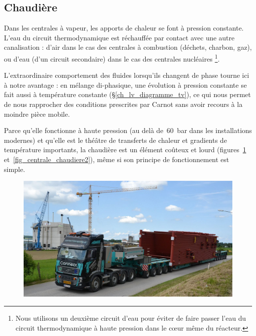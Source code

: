 	\subsection{Chaudière}
	\label{ch_chaudière}

		Dans les centrales à vapeur, les apports de chaleur se font à pression constante. L’eau du circuit thermodynamique est réchauffée par contact avec une autre canalisation : d’air dans le cas des centrales à combustion (déchets, charbon, gaz), ou d’eau (d’un circuit secondaire) dans le cas des centrales nucléaires%
		\footnote{Nous utilisons un deuxième circuit d’eau pour éviter de faire passer l’eau du circuit thermodynamique à haute pression dans le cœur même du réacteur.}\nolinebreak.

		L’extraordinaire comportement des fluides lorsqu’ils changent de phase tourne ici à notre avantage : en mélange di-phasique, une évolution à pression constante se fait aussi à température constante (\S\ref{ch_lv_diagramme_tv}),	ce qui nous permet de nous rapprocher des conditions prescrites par Carnot sans avoir recours à la moindre pièce mobile.
		
		Parce qu’elle fonctionne à haute pression (au delà de~\SI{60}{\bar} dans les installations modernes) et qu’elle est le théâtre de transferts de chaleur et gradients de température importants, la chaudière est un élément coûteux et lourd (figures~\ref{fig_centrale_chaudiere1} et~\ref{fig_centrale_chaudiere2}), même si son principe de fonctionnement est simple.

		\begin{figure}
			\begin{center}
				\includegraphics[width=\textwidth]{images/centrale_chaudiere_photo.jpg}
			\end{center}
			\label{fig_centrale_chaudiere1}
		\end{figure}

